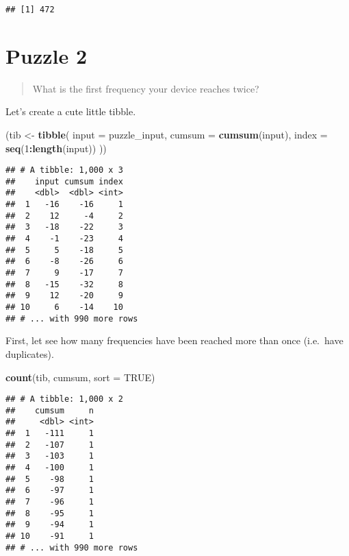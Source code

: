 \documentclass[]{book}
\newenvironment{Shaded}{\begin{snugshade}}{\end{snugshade}}
\newcommand{\KeywordTok}[1]{\textcolor[rgb]{0.13,0.29,0.53}{\textbf{#1}}}
\newcommand{\DataTypeTok}[1]{\textcolor[rgb]{0.13,0.29,0.53}{#1}}
\newcommand{\DecValTok}[1]{\textcolor[rgb]{0.00,0.00,0.81}{#1}}
\newcommand{\StringTok}[1]{\textcolor[rgb]{0.31,0.60,0.02}{#1}}
\newcommand{\OtherTok}[1]{\textcolor[rgb]{0.56,0.35,0.01}{#1}}
\newcommand{\OperatorTok}[1]{\textcolor[rgb]{0.81,0.36,0.00}{\textbf{#1}}}
\newcommand{\NormalTok}[1]{#1}
\theoremstyle{definition}
\theoremstyle{definition}
\theoremstyle{definition}
\theoremstyle{remark}
\begin{document}
\begin{verbatim}
## [1] 472
\end{verbatim}

\section{Puzzle 2}\label{puzzle-2}

\begin{quote}
What is the first frequency your device reaches twice?
\end{quote}

Let's create a cute little tibble.

\begin{Shaded}
\begin{Highlighting}[]
\NormalTok{(tib <-}\StringTok{ }\KeywordTok{tibble}\NormalTok{(}
  \DataTypeTok{input =}\NormalTok{ puzzle_input, }
  \DataTypeTok{cumsum =} \KeywordTok{cumsum}\NormalTok{(input),}
  \DataTypeTok{index =} \KeywordTok{seq}\NormalTok{(}\DecValTok{1}\OperatorTok{:}\KeywordTok{length}\NormalTok{(input))}
\NormalTok{  ))}
\end{Highlighting}
\end{Shaded}

\begin{verbatim}
## # A tibble: 1,000 x 3
##    input cumsum index
##    <dbl>  <dbl> <int>
##  1   -16    -16     1
##  2    12     -4     2
##  3   -18    -22     3
##  4    -1    -23     4
##  5     5    -18     5
##  6    -8    -26     6
##  7     9    -17     7
##  8   -15    -32     8
##  9    12    -20     9
## 10     6    -14    10
## # ... with 990 more rows
\end{verbatim}

First, let see how many frequencies have been reached more than once
(i.e.~have duplicates).

\begin{Shaded}
\begin{Highlighting}[]
\KeywordTok{count}\NormalTok{(tib, cumsum, }\DataTypeTok{sort =} \OtherTok{TRUE}\NormalTok{)}
\end{Highlighting}
\end{Shaded}

\begin{verbatim}
## # A tibble: 1,000 x 2
##    cumsum     n
##     <dbl> <int>
##  1   -111     1
##  2   -107     1
##  3   -103     1
##  4   -100     1
##  5    -98     1
##  6    -97     1
##  7    -96     1
##  8    -95     1
##  9    -94     1
## 10    -91     1
## # ... with 990 more rows
\end{verbatim}
\end{document}
